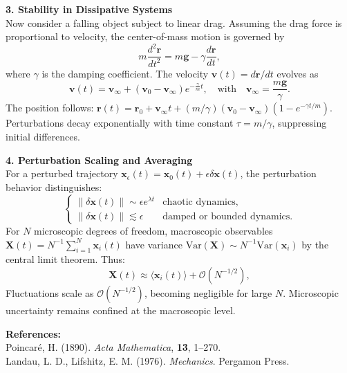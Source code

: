 \begin{technical}
\textbf{3. Stability in Dissipative Systems}\\
Now consider a falling object subject to linear drag. Assuming the drag force is proportional to velocity, the center-of-mass motion is governed by
\[
m \frac{d^2 \mathbf{r}}{dt^2} = m \mathbf{g} - \gamma \frac{d\mathbf{r}}{dt},
\]
where $\gamma$ is the damping coefficient. The velocity $\mathbf{v}(t) = d\mathbf{r}/dt$ evolves as
\[
\mathbf{v}(t) = \mathbf{v}_\infty + (\mathbf{v}_0 - \mathbf{v}_\infty) e^{-\frac{\gamma}{m} t}, \quad \text{with} \quad \mathbf{v}_\infty = \frac{m \mathbf{g}}{\gamma}.
\]
The position follows: $\mathbf{r}(t) = \mathbf{r}_0 + \mathbf{v}_\infty t + (m/\gamma)(\mathbf{v}_0 - \mathbf{v}_\infty)(1 - e^{-\gamma t/m})$. Perturbations decay exponentially with time constant $\tau = m/\gamma$, suppressing initial differences.

\textbf{4. Perturbation Scaling and Averaging}\\
For a perturbed trajectory $\mathbf{x}_\epsilon(t) = \mathbf{x}_0(t) + \epsilon \delta \mathbf{x}(t)$, the perturbation behavior distinguishes:
\[
\begin{cases}
\|\delta \mathbf{x}(t)\| \sim \epsilon e^{\lambda t} & \text{chaotic dynamics,} \\[0.5em]
\|\delta \mathbf{x}(t)\| \lesssim \epsilon & \text{damped or bounded dynamics.}
\end{cases}
\]
For $N$ microscopic degrees of freedom, macroscopic observables $\mathbf{X}(t) = N^{-1} \sum_{i=1}^N \mathbf{x}_i(t)$ have variance $\mathrm{Var}(\mathbf{X}) \sim N^{-1} \mathrm{Var}(\mathbf{x}_i)$ by the central limit theorem. Thus:
\[
\mathbf{X}(t) \approx \langle \mathbf{x}_i(t) \rangle + \mathcal{O}(N^{-1/2}),
\]
Fluctuations scale as $\mathcal{O}(N^{-1/2})$, becoming negligible for large $N$. Microscopic uncertainty remains confined at the macroscopic level.

\textbf{References:}\\
Poincaré, H. (1890). \emph{Acta Mathematica}, \textbf{13}, 1–270.\\
Landau, L. D., Lifshitz, E. M. (1976). \emph{Mechanics}. Pergamon Press.
\end{technical}
